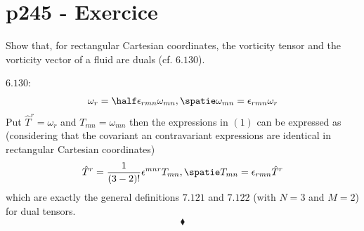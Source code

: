 \section{p245 - Exercice }
\begin{tcolorbox}
Show that, for rectangular Cartesian coordinates, the vorticity tensor and the vorticity vector of a fluid are duals (cf. $\mathbf{6.130}$).
\end{tcolorbox}
$\mathbf{6.130}$:
\begin{align}
\omega_r=\half\epsilon_{rmn}\omega_{mn},\spatie \omega_{mn}=\epsilon_{rmn}\omega_r
\end{align}
Put $\hat{T}^r= \omega_r$ and $T_{mn} = \omega_{mn}$
then the expressions in $(1)$ can be expressed as (considering that the covariant an contravariant expressions are identical in rectangular Cartesian coordinates) 
\begin{align}
\hat{T}^r=\frac{1}{(3-2)!}\epsilon^{mnr}T_{mn},\spatie T_{mn}=\epsilon_{rmn}\hat{T}^r
\end{align}
which are exactly the general definitions $\mathbf{7.121}$ and $\mathbf{7.122}$ (with $N=3$ and $M=2$) for dual tensors.
$$\blacklozenge$$
\newpage



